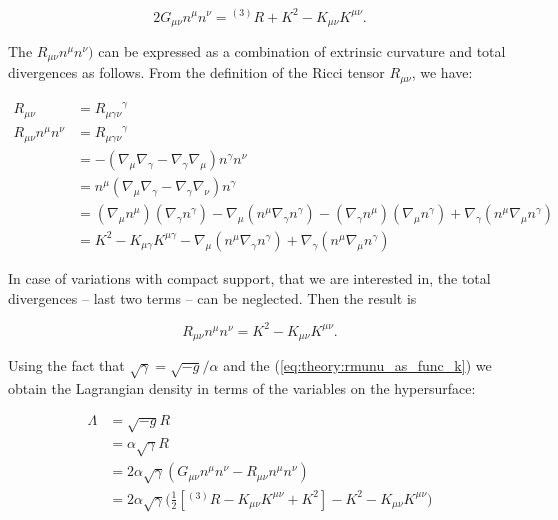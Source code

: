 {    \begin{equation}
    2G_{\mu\nu}n^{\mu}n^{\nu} = {^{(3)}R} + K^2 - K_{\mu\nu}K^{\mu\nu}.
    \end{equation}
    
    The $R_{\mu\nu}n^{\mu}n^{\nu})$ can be expressed as a combination of extrinsic curvature and total divergences as follows.
    From the definition of the Ricci tensor $R_{\mu\nu}$, we have:
    
    \begin{align}
    R_{\mu\nu} &= {R_{\mu\gamma\nu}}^{\gamma} \\
    R_{\mu\nu}n^{\mu}n^{\nu} &= {R_{\mu\gamma\nu}}^{\gamma} \\
    &= -(\nabla_{\mu}\nabla_{\gamma} - \nabla_{\gamma}\nabla_{\mu})n^{\gamma}n^{\nu} \\
    &= n^{\mu}(\nabla_{\mu}\nabla_{\gamma} - \nabla_{\gamma}\nabla_{\nu})n^{\gamma} \\
    &= (\nabla_{\mu}n^{\mu})(\nabla_{\gamma}n^{\gamma}) - \nabla_{\mu}(n^{\mu}\nabla_{\gamma}n^{\gamma}) - (\nabla_{\gamma}n^{\mu})(\nabla_{\mu}n^{\gamma}) + \nabla_{\gamma}(n^{\mu}\nabla_{\mu}n^{\gamma}) \\
    &= K^2 - K_{\mu\gamma}K^{\mu\gamma} - \nabla_{\mu}(n^{\mu}\nabla_{\gamma}n^{\gamma}) + \nabla_{\gamma}(n^{\mu}\nabla_{\mu}n^{\gamma})
    \end{align}
    
    In case of variations with compact support, that we are interested in, the total divergences -- last two terms -- can be neglected. 
    Then the result is
    
    \begin{equation}
    R_{\mu\nu}n^{\mu}n^{\nu}= K^2 - K_{\mu\nu}K^{\mu\nu}.
    \label{eq:theory:rmunu_as_func_k}
    \end{equation}
    
    
    Using the fact that $\sqrt{\gamma}=\sqrt{-g}/\alpha$ and the (\ref{eq:theory:rmunu_as_func_k}) we obtain the Lagrangian density in terms of the variables on the hypersurface:
    
    \begin{align}
    \Lambda &= \sqrt{-g}R \\
    &= \alpha\sqrt{\gamma}R \\
    &= 2\alpha\sqrt{\gamma}(G_{\mu\nu}n^{\mu}n^{\nu} - R_{\mu\nu}n^{\mu}n^{\nu})\\ 
    &= 2\alpha\sqrt{\gamma}\Big(\frac{1}{2}[{^{(3)}R} - K_{\mu\nu}K^{\mu\nu} + K^2] - K^2 - K_{\mu\nu}K^{\mu\nu}\Big)
    \end{align}
    
}
